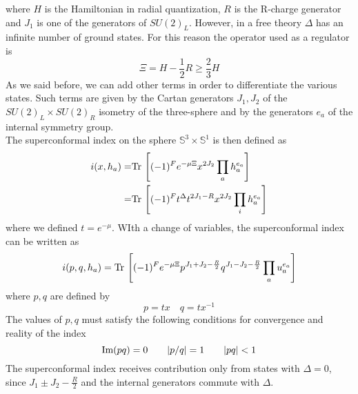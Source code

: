  where $H$ is the Hamiltonian in radial quantization, $R$ is the R-charge generator and $J_1$ is one of the generators of $SU(2)_L$. 
 However, in a free theory $\Delta$ has an infinite number of ground states. 
 For this reason the operator used as a regulator is \cite{Romelsberger:2005eg}
 \begin{equation}
 	\Xi = H - \frac{1}{2} R \geq \frac{2}{3} H 
 \end{equation}
As we said before, we can add other terms in order to differentiate the various states.
Such terms are given by the Cartan generators $J_1, J_2$ of the $SU(2)_L \times SU(2)_R$ isometry of the three-sphere and by the generators $e_a$ of the internal symmetry group.\\
The superconformal index on the sphere $\mathbb{S}^3 \times \mathbb{S}^1$ is then defined as \cite{Romelsberger:2007ec}
\begin{align}
 i( x, h_a) =&
\mathrm{Tr } \, \left[ (-1)^F  e^{ - \mu \Xi} x^{2 J_2} \prod_a h_a^{e_a} \right] \\= &
\mathrm{Tr } \, \left[ (-1)^F  t^{\Delta} t^{ 2 J_1 - R} x^{2 J_2} \prod_i h_a^{e_a} \right] 
 \end{align} 
 where we defined $t = e^{- \mu}$.
WIth a change of variables, the superconformal index can be written as 
\begin{equation}
 i( p, q, h_a) =
 \mathrm{Tr } \,  \left[  (-1)^F e^{ - \mu \Xi } p^{J_1 + J_2 - \frac{R}{2}} q^{J_1 - J_2 - \frac{R}{2} } \prod_a u_a^{e_a}    \right]
\end{equation}
where $p,q$ are defined by
\begin{equation}
p = t x \quad q = t x^{-1}
\end{equation}
The values of $p,q$ must satisfy the following conditions for convergence and reality of the index
\begin{equation}
\hbox{Im} (pq) =0 \qquad |p/q| =  1 \qquad | pq| < 1
\label{eqn:reality_convergence_condition_index}
\end{equation}
The superconformal index receives contribution only from states with $\Delta=0$, since $J_1 \pm J_2 - \frac{R}{2}$ and the internal generators commute with $\Delta$.
